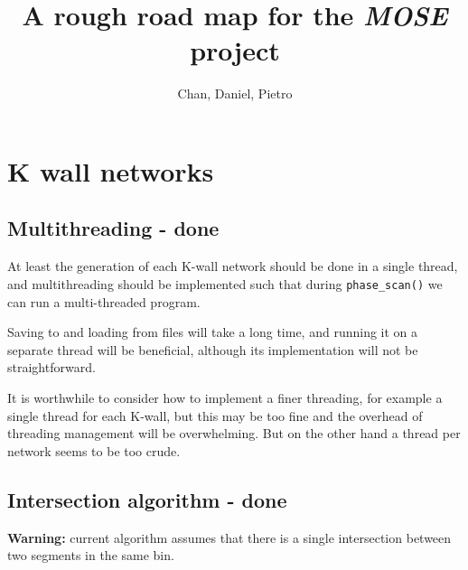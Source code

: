 \documentclass[11pt]{report}
\title{A rough road map for the \emph{MOSE} project}
\author{Chan, Daniel, Pietro}
\begin{document}
\maketitle

\tableofcontents


\chapter{K wall networks}

\section{Multithreading - {\color{red} \bf done}}
At least the generation of each K-wall network should be done in a single thread, and multithreading should be implemented such that during {\tt phase\_scan()} we can run a multi-threaded program.

Saving to and loading from files will take a long time, and running it on a separate thread will be beneficial, although its implementation will not be straightforward.

It is worthwhile to consider how to implement a finer threading, for example a single thread for each K-wall, but this may be too fine and the overhead of threading management will be overwhelming. But on the other hand a thread per network seems to be too crude.

\section{Intersection algorithm  - {\color{red} \bf done}}
{\bf Warning:} current algorithm assumes that there is a single intersection between two segments in the same bin.
\end{document}
